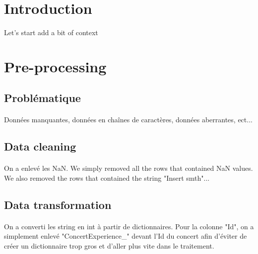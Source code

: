 \documentclass[11pt,a4paper]{article}
\begin{document}


\pagestyle{fancy}


\newpage

\section{Introduction}
\paragraph{} Let's start add a bit of context

\section{Pre-processing}

\subsection{Problématique}

\paragraph{} Données manquantes, données en chaînes de caractères, données aberrantes, ect...

\subsection{Data cleaning}

\paragraph{} On a enlevé les NaN. We simply removed all the rows that contained NaN values. We also removed the rows that contained the string "Insert smth"...

\subsection{Data transformation}

\paragraph{} On a converti les string en int à partir de dictionnaires. Pour la colonne "Id", on a simplement enlevé "ConcertExperience\_" devant l'Id du concert afin d'éviter de créer un dictionnaire trop gros et d'aller plus vite dans le traitement.
\end{document}
